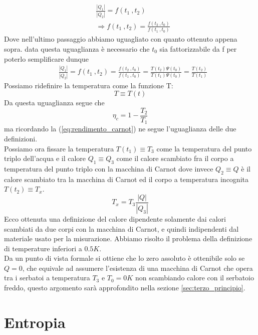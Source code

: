 \documentclass[
10pt, %
a4paper, %
oneside, %
headinclude,footinclude, %
BCOR5mm, %
]{scrartcl}
\begin{document}
\begin{align*}
	&\frac{|Q_1|}{|Q_2|} = f(t_1\ ,t_2)\\
	&\Rightarrow f(t_1\ , t_2) = \frac{f(t_2\ ,t_0)}{f(t_1\ ,t_0)}
\end{align*}
Dove nell'ultimo passaggio abbiamo uguagliato con quanto ottenuto appena sopra. data questa uguaglianza è necessario che \(t_0\) sia fattorizzabile da f per poterlo semplificare dunque
\begin{align}\label{eq:def_temperatura}
	&\frac{|Q_1|}{|Q_2|} = f(t_1\ , t_2) = \frac{f(t_2\ ,t_0)}{f(t_1\ ,t_0)}= \frac{T(t_2)\Psi(t_0)}{T(t_1)\Psi(t_0)}=\frac{T(t_2)}{T(t_1)}
\end{align}
Possiamo ridefinire la temperatura come la funzione T: \[T \equiv T(t)\]
Da questa uguaglianza segue che 
\[\eta_c = 1-\frac{T_2}{T_1}\]
ma ricordando la (\ref{eq:rendimento_carnot}) ne segue l'uguaglianza delle due definizioni.\\
Possiamo ora fissare la temperatura $T(t_1)\equiv T_3$ come la temperatura del punto triplo dell'acqua e il calore \(Q_1\equiv Q_3\) come il calore scambiato fra il corpo a temperatura del punto triplo con la macchina di Carnot dove invece \(Q_2\equiv Q\) è il calore scambiato tra la macchina di Carnot ed il corpo a temperatura incognita \(T(t_2)\equiv T_x\). 
\[T_x = T_3\frac{|Q|}{|Q_3|}\]
Ecco ottenuta una definizione del calore dipendente solamente dai calori scambiati da due corpi con la macchina di Carnot, e quindi indipendenti dal materiale usato per la misurazione. Abbiamo risolto il problema della definizione di temperature inferiori a \(0.5 K\).\\
Da un punto di vista formale si ottiene che lo zero assoluto è ottenibile solo se \(Q = 0\), che equivale ad assumere l'esistenza di una macchina di Carnot che opera tra i serbatoi a temperatura \(T_3\) e \(T_0 = 0K\) non scambiando calore con il serbatoio freddo, questo argomento sarà approfondito nella sezione \ref{sec:terzo_principio}. 
\newpage
\section{Entropia}
\end{document}

